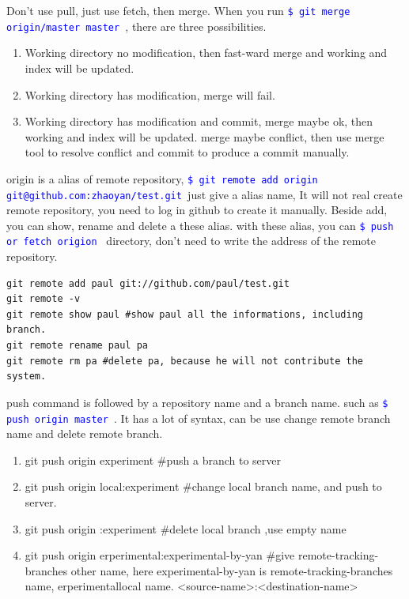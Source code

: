 \documentclass[paper=8.5in:11in, twoside, 12pt, pagesize=pdftex]{book}
\newcommand{\linuxcommand}[1]{\texttt{\textcolor{blue}{\$ #1 \Pisymbol{psy}{191}}}}
\begin{document}
	Don't use pull, just use fetch, then merge.  When you run \linuxcommand{git merge origin/master master}, there are three possibilities. 
	\begin{enumerate}
		\item Working directory no modification, then fast-ward merge and working and index will be updated. 
		
		\item Working directory has modification, merge will fail. 
		
		\item Working directory has modification and commit, merge maybe ok, then working and index will be updated. merge maybe conflict, then use merge tool to resolve conflict and commit to produce a commit manually.
	\end{enumerate}
	
	
	origin is a alias of remote repository,  \linuxcommand{git remote add origin git@github.com:zhaoyan/test.git}just give a alias name, It will not real create remote repository, you need to log in github to create it manually.  Beside add, you can show, rename and delete a these alias. with these alias, you can \linuxcommand{push or fetch origion} directory, don't need to write the address of the remote repository.
	
\begin{lstlisting}
git remote add paul git://github.com/paul/test.git
git remote -v
git remote show paul #show paul all the informations, including branch.
git remote rename paul pa
git remote rm pa #delete pa, because he will not contribute the system.	
\end{lstlisting}
	
	push command is followed by a repository name and a branch name.  such as \linuxcommand{push origin master}. It has a lot of syntax, can be use change remote branch name and delete remote branch.
	\begin{enumerate}
		\item git push origin experiment \#push a branch to server
		\item git push origin local:experiment \#change local branch name, and push to server. 
		\item git push origin :experiment \#delete local branch ,use empty name 
		\item git push origin erperimental:experimental-by-yan \#give remote-tracking-branches other name, here experimental-by-yan is remote-tracking-branches name, erperimentallocal name. <source-name>:<destination-name>
	\end{enumerate}
	
\end{document}
